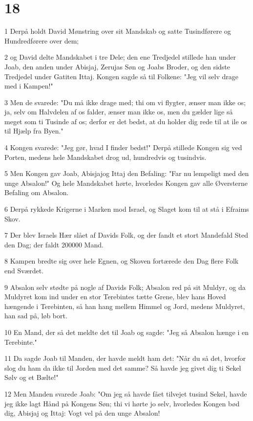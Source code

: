 \chapter{18}

\par 1 Derpå holdt David Mønstring over sit Mandskab og satte Tusindførere og Hundredførere over dem;
\par 2 og David delte Mandskabet i tre Dele; den ene Tredjedel stillede han under Joab, den anden under Abisjaj, Zerujas Søn og Joabs Broder, og den sidste Tredjedel under Gatiten Ittaj. Kongen sagde så til Folkene: "Jeg vil selv drage med i Kampen!"
\par 3 Men de svarede: "Du må ikke drage med; thi om vi flygter, ænser man ikke os; ja, selv om Halvdelen af os falder, ænser man ikke os, men du gælder lige så meget som ti Tusinde af os; derfor er det bedst, at du holder dig rede til at ile os til Hjælp fra Byen."
\par 4 Kongen svarede: "Jeg gør, hvad I finder bedst!" Derpå stillede Kongen sig ved Porten, medens hele Mandskabet drog ud, hundredvis og tusindvis.
\par 5 Men Kongen gav Joab, Abisjajog Ittaj den Befaling: "Far nu lempeligt med den unge Absalon!" Og hele Mandskabet hørte, hvorledes Kongen gav alle Øversterne Befaling om Absalon.
\par 6 Derpå rykkede Krigerne i Marken mod Israel, og Slaget kom til at stå i Efraims Skov.
\par 7 Der blev Israels Hær slået af Davids Folk, og der fandt et stort Mandefald Sted den Dag; der faldt 200000 Mand.
\par 8 Kampen bredte sig over hele Egnen, og Skoven fortærede den Dag flere Folk end Sværdet.
\par 9 Absalon selv stødte på nogle af Davids Folk; Absalon red på sit Muldyr, og da Muldyret kom ind under en stor Terebintes tætte Grene, blev hans Hoved hængende i Terebinten, så han hang mellem Himmel og Jord, medens Muldyret, han sad på, løb bort.
\par 10 En Mand, der så det meldte det til Joab og sagde: "Jeg så Absalon hænge i en Terebinte."
\par 11 Da sagde Joab til Manden, der havde meldt ham det: "Når du så det, hvorfor slog du ham da ikke til Jorden med det samme? Så havde jeg givet dig ti Sekel Sølv og et Bælte!"
\par 12 Men Manden svarede Joab: "Om jeg så havde fået tilvejet tusind Sekel, havde jeg ikke lagt Hånd på Kongens Søn; thi vi hørte jo selv, hvorledes Kongen bød dig, Abisjaj og Ittaj: Vogt vel på den unge Absalon!

